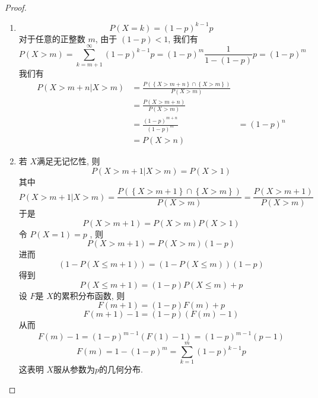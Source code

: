 \documentclass[../main.tex]{subfiles}
\begin{document}
\begin{proof}
    \begin{enumerate}
        \item \[
        P\left( X= k \right)= \left( 1-p \right)^{k-1}p  
        \]对于任意的正整数 \(  m  \), 由于 \(  \left( 1-p \right)< 1   \), 我们有   \[
        P\left( X> m \right)= \sum _{k= m+ 1}^{\infty}\left( 1-p \right)^{k-1}p=   \left( 1-p \right)^{m}\frac{1 }{1-\left( 1-p \right)  }p= \left( 1-p \right)^{m} 
        \]我们有 \[
        \begin{aligned}
        P\left( X> m+ n|X> m \right)&=  \frac{P\left( \left\{ X> m+ n \right\}\cap \left\{ X> m \right\} \right)  }{P\left( X> m \right)  }   \\ 
         &= \frac{P\left( X> m+ n \right)  }{P\left( X> m \right)  }\\ 
          &=\frac{\left( 1-p \right)^{m+ n}  }{\left( 1-p \right)^{m}  } 
           &=   \left( 1-p \right)^{n}\\ 
            &= P\left( X> n \right)  
        \end{aligned}
        \]

        \item 若 \(  X  \)满足无记忆性, 则  \[
        P\left( X> m+ 1| X> m \right)= P\left( X> 1 \right)  
        \]其中 \[
        P\left( X> m+ 1|X> m \right)= \frac{P\left( \left\{ X> m+ 1 \right\}\cap \left\{ X> m \right\} \right)  }{P\left( X> m \right)  }= \frac{P\left( X> m+ 1 \right)  }{P\left( X> m \right)  }   
        \]于是 \[
        P\left( X> m+ 1 \right)= P\left( X> m \right)P\left( X> 1 \right)   
        \] 令 \(  P\left( X= 1 \right)= p   \) , 则 \[
        P\left( X> m+ 1 \right)= P\left( X> m \right)\left( 1-p \right)   
        \]进而 \[
        \left( 1-P\left( X\le m+ 1 \right)  \right)= \left( 1-P\left( X\le m \right)  \right)\left( 1-p \right)   
        \]得到 \[
        P\left( X\le m+ 1 \right)= \left( 1-p \right)P\left( X\le m \right)+ p   
        \] 设 \(  F  \)是 \(  X  \)的累积分布函数, 则 \[
        F\left( m+ 1 \right)= \left( 1-p \right)F\left( m \right)+ p   
        \]   \[
        F\left( m+ 1 \right)-1 = \left( 1-p \right)\left( F\left( m \right)-1  \right)  
        \]从而 \[
        F\left( m \right)-1= \left( 1-p \right)^{m-1}\left( F\left( 1 \right)-1  \right)= \left( 1-p \right)^{m-1}\left( p-1 \right)     
        \] \[
        F\left( m \right)= 1-\left( 1-p \right)^{m}  = \sum _{k= 1}^{m}\left( 1-p \right)^{k-1}p 
        \]这表明 \(  X  \)服从参数为\(  p  \)的几何分布.  
    \end{enumerate}
    
\end{proof}
\end{document}
